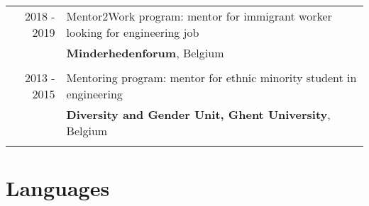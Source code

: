 \documentclass[a4paper,10pt]{article} %
\begin{document}
\begin{tabular}{rp{11.7cm}}

2018 - 2019 & Mentor2Work program: mentor for immigrant worker looking for engineering job \\
 & \textbf{Minderhedenforum}, Belgium\\

&\\
2013 - 2015 & Mentoring program: mentor for ethnic minority student in engineering\\
 & \textbf{Diversity and Gender Unit, Ghent University}, Belgium\\
&\\

\end{tabular}

\section{Languages}
\end{document}
